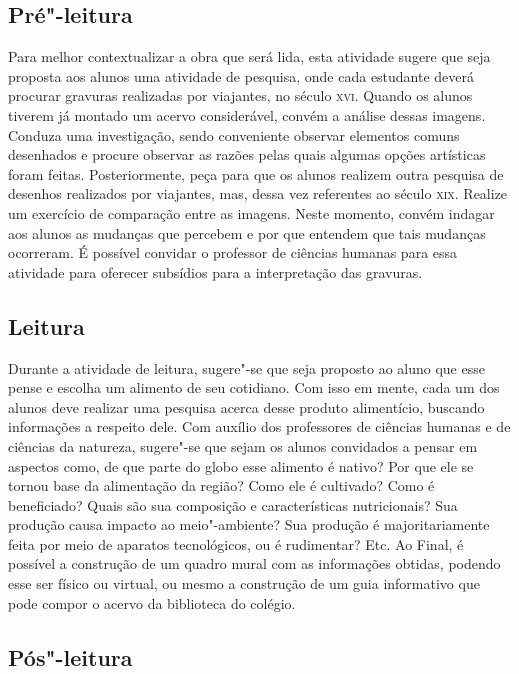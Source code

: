 \documentclass[12pt]{extarticle}
\begin{document}

\subsection{Pré"-leitura}

Para melhor contextualizar a obra que será lida, esta
atividade sugere que seja proposta aos alunos uma atividade de pesquisa,
onde cada estudante deverá procurar gravuras realizadas por viajantes,
no século \textsc{xvi}. Quando os alunos tiverem já montado um acervo
considerável, convém a análise dessas imagens. Conduza uma investigação,
sendo conveniente observar elementos comuns desenhados e procure
observar as razões pelas quais algumas opções artísticas foram feitas.
Posteriormente, peça para que os alunos realizem outra pesquisa de
desenhos realizados por viajantes, mas, dessa vez referentes ao século
\textsc{xix}. Realize um exercício de comparação entre as imagens. Neste momento,
convém indagar aos alunos as mudanças que percebem e por que entendem
que tais mudanças ocorreram. É possível convidar o professor de ciências
humanas para essa atividade para oferecer subsídios para a interpretação
das gravuras.

\subsection{Leitura}

Durante a atividade de leitura, sugere"-se que seja proposto ao aluno que
esse pense e escolha um alimento de seu cotidiano. Com isso em mente,
cada um dos alunos deve realizar uma pesquisa acerca desse produto
alimentício, buscando informações a respeito dele. Com auxílio dos
professores de ciências humanas e de ciências da natureza, sugere"-se que
sejam os alunos convidados a pensar em aspectos como, de que parte do
globo esse alimento é nativo? Por que ele se tornou base da alimentação
da região? Como ele é cultivado? Como é beneficiado? Quais são sua
composição e características nutricionais? Sua produção causa impacto ao
meio"-ambiente? Sua produção é majoritariamente feita por meio de
aparatos tecnológicos, ou é rudimentar? Etc. Ao Final, é possível a
construção de um quadro mural com as informações obtidas, podendo esse
ser físico ou virtual, ou mesmo a construção de um guia informativo que
pode compor o acervo da biblioteca do colégio.

\subsection{Pós"-leitura}
\end{document}
